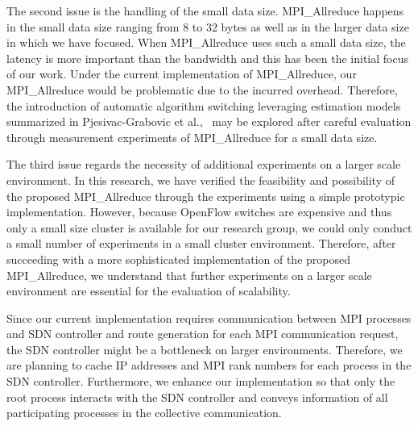 The second issue is the handling of the small data size.
MPI\_Allreduce happens in the small data size ranging from 8 to
32 bytes as well as in the larger data size in which we have focused.
When MPI\_Allreduce uses such a small data size, the latency is
more important than the bandwidth and this has been the initial focus of
our work. Under the current implementation of MPI\_Allreduce,
our MPI\_Allreduce would be problematic due to the incurred
overhead. Therefore, the introduction of automatic algorithm switching
leveraging estimation models summarized in Pjesivac-Grabovic et
al.,~\autocite{PjesivacGrbovic} may be explored after careful evaluation through
measurement experiments of MPI\_Allreduce for a small data size.

The third issue regards the necessity of additional experiments on a
larger scale environment. In this research, we have verified the
feasibility and possibility of the proposed MPI\_Allreduce
through the experiments using a simple prototypic implementation.
However, because OpenFlow switches are expensive and thus only a small
size cluster is available for our research group, we could only conduct
a small number of experiments in a small cluster environment. Therefore,
after succeeding with a more sophisticated implementation of the
proposed MPI\_Allreduce, we understand that further experiments
on a larger scale environment are essential for the evaluation of
scalability.

Since our current implementation requires communication between MPI
processes and SDN controller and route generation for each MPI
communication request, the SDN controller might be a bottleneck on
larger environments. Therefore, we are planning to cache IP addresses
and MPI rank numbers for each process in the SDN controller.
Furthermore, we enhance our implementation so that only the root process
interacts with the SDN controller and conveys information of all
participating processes in the collective communication.
